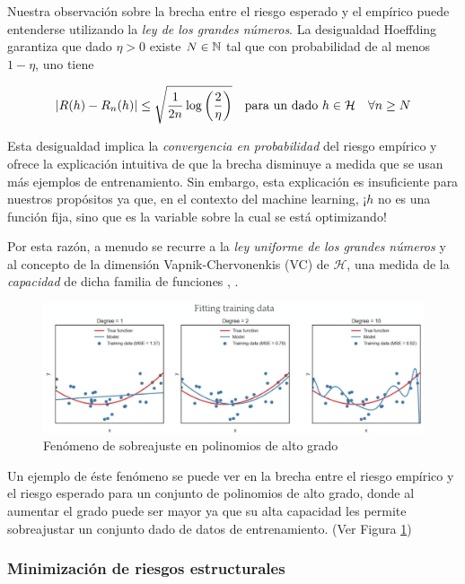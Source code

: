 Nuestra observaci\'on sobre la brecha entre el riesgo esperado y el emp\'irico puede entenderse utilizando la \textit{ley de los grandes n\'umeros}. La desigualdad Hoeffding \cite{hoeffding:1962} garantiza que dado $\eta>0$ existe $N \in {\mathbb{N}}$ tal que con probabilidad de al menos $1 - \eta$, uno tiene

\begin{equation}
\left\lvert R(h) - R_n(h)\right\rvert \leq \sqrt{\frac{1}{2n} \log\left(\frac{2}{\eta}\right)} \quad \text{para un dado } h \in \mathcal{H} \quad \forall n \geq N
\end{equation}

Esta desigualdad implica la \textit{convergencia en probabilidad} del riesgo emp\'irico y  ofrece la explicaci\'on intuitiva de que la brecha disminuye a medida que se usan m\'as ejemplos de entrenamiento. Sin embargo, esta explicaci\'on es insuficiente para nuestros prop\'ositos ya que, en el contexto del machine learning, ¡$h$ no es una funci\'on fija, sino que es la variable sobre la cual se est\'a optimizando!

Por esta raz\'on, a menudo se recurre a la \textit{ley uniforme de los grandes n\'umeros} y al concepto de la dimensi\'on Vapnik-Chervonenkis (VC) de $\mathcal{H} $, una medida de la \textit{capacidad} de dicha familia de funciones \cite{vapnik:1971}, \cite{mohri:2012}. 

\begin{figure}[h]
	\centering
	\includegraphics[scale=.3]{gfx/overfitting.png}
	\caption{Fen\'omeno de sobreajuste en polinomios de alto grado}
	\label{gfx: overfitting}
\end{figure}


Un ejemplo de \'este fen\'omeno se puede ver en la brecha entre el riesgo emp\'irico y el riesgo esperado para un conjunto de polinomios de alto grado, donde al aumentar el grado puede ser mayor ya que su alta capacidad les permite sobreajustar un conjunto dado de datos de entrenamiento. (Ver Figura \ref{gfx: overfitting})

\subsubsection{Minimizaci\'on de riesgos estructurales}

